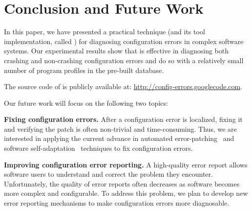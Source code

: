 \section{Conclusion and Future Work}

In this paper, we have presented a practical technique (and
its tool implementation, called \ourtool) for diagnosing
configuration errors in complex software systems.
Our experimental results show that \ourtool is effective in
diagnosing both crashing and non-crashing configuration errors
and do so with a relatively small number of program
profiles in the pre-built database.

The source code of \ourtool is publicly available at:
\url{http://config-errors.googlecode.com}.

\vspace{1mm}

Our future
work will focus on the following two topics:

\textbf{Fixing configuration errors.} After a configuration error
is localized, fixing it and verifying the patch is
often non-trivial and time-consuming. Thus, we
are interested in applying the current advance in
automated error-patching~\cite{rangefix} and
software self-adaptation~\cite{Wang:2009:STR, Mori:2011:LSU} techniques to
fix configuration errors.


\textbf{Improving configuration error reporting.} A high-quality
error report allows software users to understand and correct the problem
they encounter. 
Unfortunately, the quality of error reports often
decreases as software becomes more complex and configurable.
To address this problem, we plan to develop new error reporting mechanisms
to make configuration errors
more diagnosable.









